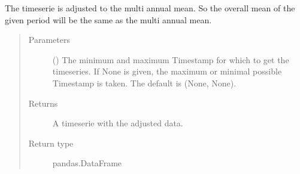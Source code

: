 \documentclass[letterpaper,10pt,english]{sphinxmanual}
\begin{document}
\begin{fulllineitems}
\begin{fulllineitems}
\sphinxAtStartPar
The timeserie is adjusted to the multi annual mean.
So the overall mean of the given period will be the same as the multi annual mean.
\begin{quote}\begin{description}
\item[{Parameters}] \leavevmode
\sphinxAtStartPar
{} ({\hyperref[\detokenize{weatherDB.lib:weatherDB.lib.utils.TimestampPeriod}]{}}\sphinxstyleliteralemphasis{\sphinxupquote{(}}\sphinxstyleliteralemphasis{\sphinxupquote{)}}\sphinxstyleliteralemphasis{\sphinxupquote{, }}) \textendash{} The minimum and maximum Timestamp for which to get the timeseries.
If None is given, the maximum or minimal possible Timestamp is taken.
The default is (None, None).

\item[{Returns}] \leavevmode
\sphinxAtStartPar
A timeserie with the adjusted data.

\item[{Return type}] \leavevmode
\sphinxAtStartPar
pandas.DataFrame

\end{description}\end{quote}

\end{fulllineitems}


\end{fulllineitems}

\end{document}
